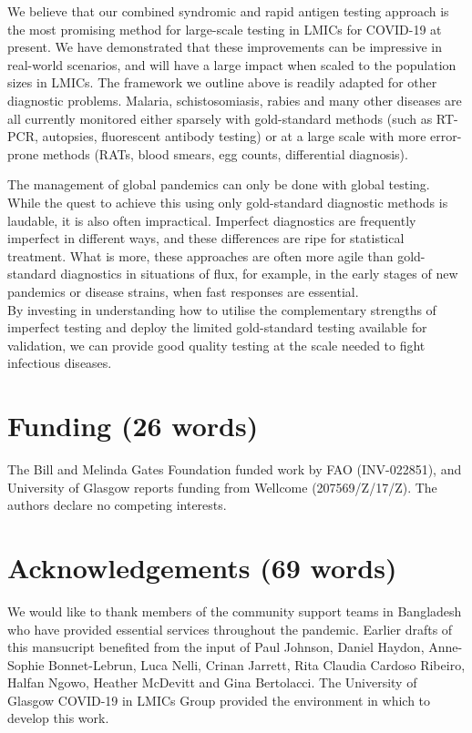 \documentclass[]{elsarticle} %
\begin{document}
We believe that our combined syndromic and rapid antigen testing approach is the most promising method for large-scale testing in LMICs for COVID-19 at present.
We have demonstrated that these improvements can be impressive in real-world scenarios, and will have a large impact when scaled to the population sizes in LMICs.
The framework we outline above is readily adapted for other diagnostic problems.
Malaria, schistosomiasis, rabies and many other diseases are all currently monitored either sparsely with gold-standard methods (such as RT-PCR, autopsies, fluorescent antibody testing) or at a large scale with more error-prone methods (RATs, blood smears, egg counts, differential diagnosis).

The management of global pandemics can only be done with global testing.
While the quest to achieve this using only gold-standard diagnostic methods is laudable, it is also often impractical.
Imperfect diagnostics are frequently imperfect in different ways, and these differences are ripe for statistical treatment.
What is more, these approaches are often more agile than gold-standard diagnostics in situations of flux, for example, in the early stages of new pandemics or disease strains, when fast responses are essential.\\
By investing in understanding how to utilise the complementary strengths of imperfect testing and deploy the limited gold-standard testing available for validation, we can provide good quality testing at the scale needed to fight infectious diseases.

\hypertarget{funding-26-words}{%
\section{Funding (26 words)}\label{funding-26-words}}

The Bill and Melinda Gates Foundation funded work by FAO (INV-022851), and University of Glasgow reports funding from Wellcome (207569/Z/17/Z).
The authors declare no competing interests.

\hypertarget{acknowledgements-69-words}{%
\section{Acknowledgements (69 words)}\label{acknowledgements-69-words}}

We would like to thank members of the community support teams in Bangladesh who have provided essential services throughout the pandemic.
Earlier drafts of this mansucript benefited from the input of Paul Johnson, Daniel Haydon, Anne-Sophie Bonnet-Lebrun, Luca Nelli, Crinan Jarrett, Rita Claudia Cardoso Ribeiro, Halfan Ngowo, Heather McDevitt and Gina Bertolacci.
The University of Glasgow COVID-19 in LMICs Group provided the environment in which to develop this work.
\end{document}
